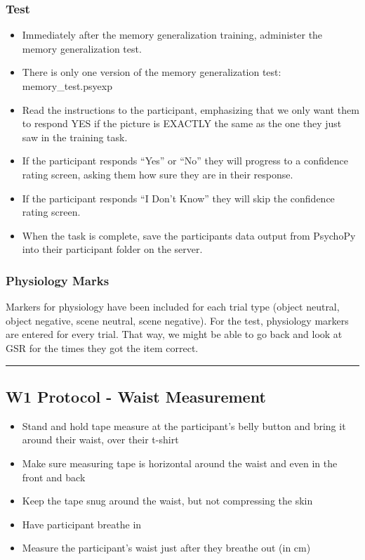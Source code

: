 \documentclass[]{book}
\providecommand{\tightlist}{%
  \setlength{\itemsep}{0pt}\setlength{\parskip}{0pt}}
\begin{document}
\hypertarget{test}{%
\subsubsection{Test}\label{test}}

\begin{itemize}
\tightlist
\item
  Immediately after the memory generalization training, administer the memory generalization test.
\item
  There is only one version of the memory generalization test: memory\_test.psyexp
\item
  Read the instructions to the participant, emphasizing that we only want them to respond YES if the picture is EXACTLY the same as the one they just saw in the training task.
\item
  If the participant responds ``Yes'' or ``No'' they will progress to a confidence rating screen, asking them how sure they are in their response.
\item
  If the participant responds ``I Don't Know'' they will skip the confidence rating screen.
\item
  When the task is complete, save the participants data output from PsychoPy into their participant folder on the server.
\end{itemize}

\hypertarget{physiology-marks}{%
\subsubsection{Physiology Marks}\label{physiology-marks}}

Markers for physiology have been included for each trial type (object neutral, object negative, scene neutral, scene negative). For the test, physiology markers are entered for every trial. That way, we might be able to go back and look at GSR for the times they got the item correct.

\begin{center}\rule{0.5\linewidth}{0.5pt}\end{center}

\hypertarget{w1-protocol---waist-measurement}{%
\subsection{W1 Protocol - Waist Measurement}\label{w1-protocol---waist-measurement}}

\begin{itemize}
\tightlist
\item
  Stand and hold tape measure at the participant's belly button and bring it around their waist, over their t-shirt
\item
  Make sure measuring tape is horizontal around the waist and even in the front and back
\item
  Keep the tape snug around the waist, but not compressing the skin
\item
  Have participant breathe in
\item
  Measure the participant's waist just after they breathe out (in cm)
\end{itemize}
\end{document}
